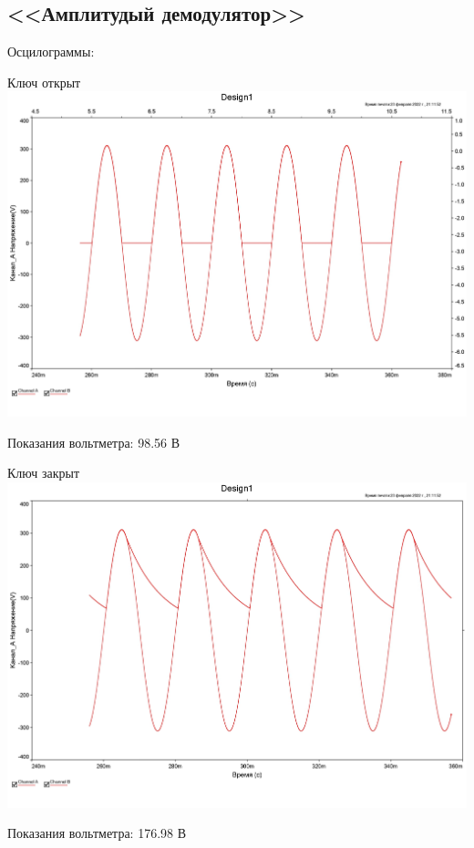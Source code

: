 \documentclass[11pt]{article}
\begin{document}
\subsection{<<Амплитудый демодулятор>>}
Осцилограммы:
\begin{center}
    Ключ открыт
    \includegraphics[width=1\linewidth]{1/osc_key_open.jpg}
\end{center}
Показания вольтметра: 98.56 В
\begin{center}
    Ключ закрыт
    \includegraphics[width=1\linewidth]{1/osc_key_close.jpg}
\end{center}
Показания вольтметра: 176.98 В
\end{document}
